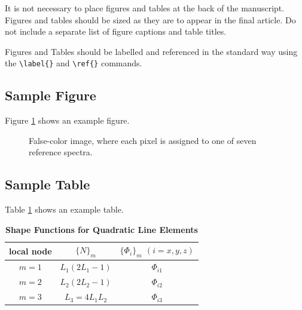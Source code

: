 \documentclass[9pt,twocolumn,twoside]{styles/osajnl}
\begin{document}
It is not necessary to place figures and tables at the back of the manuscript. Figures and tables should be sized as they are to appear in the final article. Do not include a separate list of figure captions and table titles.

Figures and Tables should be labelled and referenced in the standard way using the \verb|\label{}| and \verb|\ref{}| commands.

\subsection{Sample Figure}

Figure \ref{fig:false-color} shows an example figure.

\begin{figure}[htbp]
\centering
{}
\caption{False-color image, where each pixel is assigned to one of seven reference spectra.}
\label{fig:false-color}
\end{figure}

\subsection{Sample Table}

Table \ref{tab:shape-functions} shows an example table.

\begin{table}[htbp]
\centering
\caption{\bf Shape Functions for Quadratic Line Elements}
\begin{tabular}{ccc}
\hline
local node & $\{N\}_m$ & $\{\Phi_i\}_m$ $(i=x,y,z)$ \\
\hline
$m = 1$ & $L_1(2L_1-1)$ & $\Phi_{i1}$ \\
$m = 2$ & $L_2(2L_2-1)$ & $\Phi_{i2}$ \\
$m = 3$ & $L_3=4L_1L_2$ & $\Phi_{i3}$ \\
\hline
\end{tabular}
  \label{tab:shape-functions}
\end{table}
\end{document}
